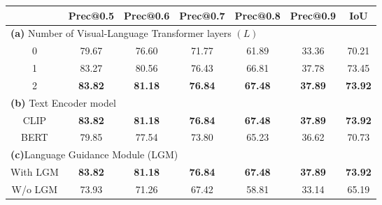 \begin{table*}[h]
\centering
\begin{tabular}{c|c|c|c|c|c|c}
\toprule
\multicolumn{1}{c|}{} & Prec@0.5 & Prec@0.6 & Prec@0.7 & Prec@0.8 & Prec@0.9 & IoU \\
\midrule
\multicolumn{7}{l}{\textbf{(a)} Number of Visual-Language Transformer layers $(L)$}                                                                                                                                                                                                             \\ \midrule
0                          & 79.67             & 76.60             & 71.77             & 61.89             & 33.36             & 70.21   \\
1                          & 83.27             & 80.56             & 76.43             & 66.81             & 37.78             & 73.45   \\
2                        & \textbf{83.82}             & \textbf{81.18}             & \textbf{76.84}             & \textbf{67.48}             & \textbf{37.89}             & \textbf{73.92}   \\ \midrule
\multicolumn{7}{l}{\textbf{(b)} Text Encoder model}                                                                                                                                                                                                     \\ \midrule
CLIP                      & \textbf{83.82}             & \textbf{81.18}             & \textbf{76.84}             & \textbf{67.48}             & \textbf{37.89}             & \textbf{73.92}   \\
BERT                       & 79.85             & 77.54             & 73.80             & 65.23             & 36.62             & 70.73   \\ \midrule
\multicolumn{7}{l}{\textbf{(c)}Language Guidance Module (LGM)}                                                                                                                                                                                          \\ \midrule
With LGM                  & \textbf{83.82}             & \textbf{81.18}             & \textbf{76.84}             & \textbf{67.48}             & \textbf{37.89}             & \textbf{73.92}   \\
W/o LGM                    & 73.93             & 71.26             & 67.42             & 58.81             & 33.14             & 65.19   \\ \midrule

\end{tabular}
\end{table*}
